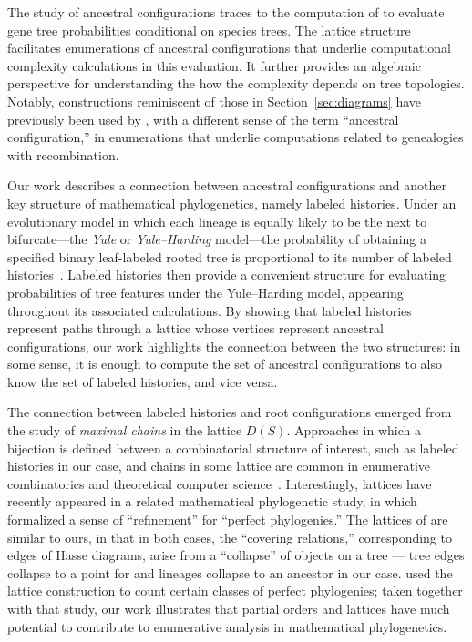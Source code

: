 \documentclass[10pt]{article}
\begin{document}
The study of ancestral configurations traces to the computation of \cite{wu2012coalescent} to evaluate gene tree probabilities conditional on species trees. The lattice structure facilitates enumerations of ancestral configurations that underlie computational complexity calculations in this evaluation. It further provides an algebraic perspective for understanding the how the complexity depends on tree topologies. Notably, constructions reminiscent of those in Section~\ref{sec:diagrams} have previously been used by \cite{song2006counting}, with a different sense of the term ``ancestral configuration,'' in enumerations that underlie computations related to genealogies with recombination.

Our work describes a connection between ancestral configurations and another key structure of mathematical phylogenetics, namely labeled histories. Under an evolutionary model in which each lineage is equally likely to be the next to bifurcate---the \emph{Yule} or \emph{Yule--Harding} model---the probability of obtaining a specified binary leaf-labeled rooted tree is proportional to its number of labeled histories~\citep{harding1971probabilities, brown1994probabilities, steel2001properties, wiehe2021, King2023}. Labeled histories then provide a convenient structure for evaluating probabilities of tree features under the Yule--Harding model, appearing throughout its associated calculations. By showing that labeled histories represent paths through a lattice whose vertices represent ancestral configurations, our work highlights the connection between the two structures: in some sense, it is enough to compute the set of ancestral configurations to also know the set of labeled histories, and vice versa.

The connection between labeled histories and root configurations emerged from the study of \emph{maximal chains} in the lattice $D(S)$. Approaches in which a bijection is defined between a combinatorial structure of interest, such as labeled histories in our case, and chains in some lattice are common in enumerative combinatorics \citep[Ch.~3]{stanley} and theoretical computer science~\citep[Ch.~14]{garg2015introduction}. Interestingly, lattices have recently appeared in a related mathematical phylogenetic study, in which \cite{palacios2021enumeration} formalized a sense of ``refinement'' for ``perfect phylogenies.'' The lattices of \cite{palacios2021enumeration} are similar to ours, in that in both cases, the ``covering relations,'' corresponding to edges of Hasse diagrams, arise from a ``collapse'' of objects on a tree --- tree edges collapse to a point for \cite{palacios2021enumeration} and lineages collapse to an ancestor in our case. \cite{palacios2021enumeration} used the lattice construction to count certain classes of perfect phylogenies; taken together with that study, our work illustrates that partial orders and lattices have much potential to contribute to enumerative analysis in mathematical phylogenetics.
\end{document}
